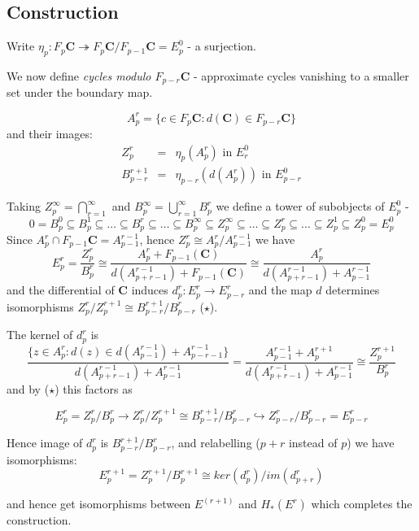 \subsection{Construction}\label{df4.5.4}
Write $\eta_p : F_p\mathbf C \twoheadrightarrow F_p\mathbf C /
F_{p-1}\mathbf C = E^0_p$ - a surjection.

We now define \textit{cycles modulo $F_{p-r}\mathbf C$ }-
approximate cycles vanishing to a smaller set under the boundary
map.

$$A_p^r = \{ c\in F_p \mathbf C : d(\mathbf C)\in F_{p-r} \mathbf
C \}$$ and their images:
\begin{eqnarray}
\nonumber Z_p^r &=& \eta_p(A_p^r) \text{ in } E_r^0\\
\nonumber B_{p-r}^{r+1} &=& \eta_{p-r} (d(A_p^r)) \text{ in }
E^0_{p-r}
\end{eqnarray}

Taking $Z_p^\infty = \bigcap_{r=1}^\infty$ and $B_p^\infty =
\bigcup_{r=1}^\infty B_p^r$ we define a tower of subobjects of
$E_p^0$ -
$$0=B^0_p\subseteq B^1_p\subseteq\dots\subseteq
B^r_p\subseteq\dots\subseteq B_p^\infty\subseteq
Z_p^\infty\subseteq\dots\subseteq Z_p^r\subseteq\dots\subseteq
Z^1_p\subseteq Z^0_p = E^0_p$$ Since $A_p^r \cap F_{p-1}\mathbf C
= A_{p-1}^{r-1}$, hence $Z_p^r \cong A_p^r / A_{p-1}^{r-1}$ we
have
$$ E_p^r = \frac{Z_p^r}{B_p^r}\cong \frac{A^r_p + F_{p-1}(\mathbf C)}{d(A_{p+r-1}^{r-1})+F_{p-1}(\mathbf
C)}\cong \frac{A^r_p}{d(A^{r-1}_{p+r-1}) + A^{r-1}_{p-1}}$$and the
differential of $\mathbf C$ induces $d^r_p : E^r_p \rightarrow
E^r_{p-r}$ and the map $d$ determines isomorphisms $Z_p^r /
Z^{r+1}_p \cong B_{p-r}^{r+1} / B^r_{p-r}$ ($\star$).

The kernel of $d_p^r$ is
$$\frac{\{z\in A^r_p : d(z) \in d(A^{r-1}_{p-1}) + A^{r-1}_{p-r-1} \}}{d(A^{r-1}_{p+r-1}) +
A^{r-1}_{p-1}}=
\frac{A^{r-1}_{p-1}+A_p^{r+1}}{d(A^{r-1}_{p+r-1})+A^{r-1}_{p-1}}\cong
\frac{Z_p^{r+1}}{B^r_p}$$ and by ($\star$) this factors as

$$E^r_p = Z^r_p / B^r_p \rightarrow Z^r_p / Z^{r+1}_p\cong
B^{r+1}_{p-r} / B^r_{p-r} \hookrightarrow Z^r_{p-r} / B^r_{p-r} =
E^r_{p-r}$$

Hence image of $d^r_p$ is $B^{r+1}_{p-r} / B^r_{p-r}$, and
relabelling ($p+r$ instead of $p$) we have isomorphisms:
$$E_p^{r+1} = Z^{r+1}_p / B^{r+1}_p \cong
ker(d^r_p)/im(d^r_{p+r})$$

and hence get isomorphisms between $E^(r+1)$ and $H_* (E^r)$ which
completes the construction.



